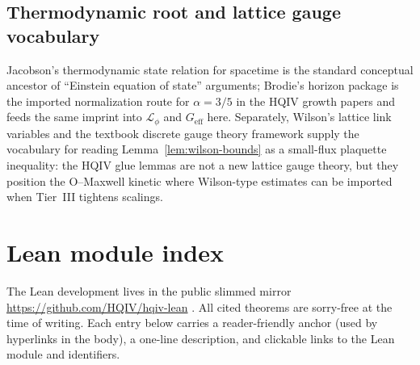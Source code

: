 \documentclass[11pt]{amsart}
\begin{document}
\subsection{Thermodynamic root and lattice gauge vocabulary}

Jacobson's thermodynamic state relation for spacetime \cite{jacobson1995} is the standard conceptual ancestor of ``Einstein equation of state'' arguments; Brodie's horizon package \cite{brodie2026} is the imported normalization route for \(\alpha=3/5\) in the HQIV growth papers and feeds the same imprint into \(\mathcal{L}_\phi\) and \(G_{\mathrm{eff}}\) here. Separately, Wilson's lattice link variables \cite{wilson1974} and the textbook discrete gauge theory framework \cite{creutz1983} supply the vocabulary for reading Lemma~\ref{lem:wilson-bounds} as a small-flux plaquette inequality: the HQIV glue lemmas are not a new lattice gauge theory, but they position the O--Maxwell kinetic where Wilson-type estimates can be imported when Tier~III tightens scalings.

\appendix

\section{Lean module index}
\label{app:lean-index}

The Lean development lives in the public slimmed mirror \url{https://github.com/HQIV/hqiv-lean} \cite{hqiv-lean}. All cited theorems are sorry-free at the time of writing. Each entry below carries a reader-friendly anchor (used by hyperlinks in the body), a one-line description, and clickable links to the Lean module and identifiers.
\end{document}
